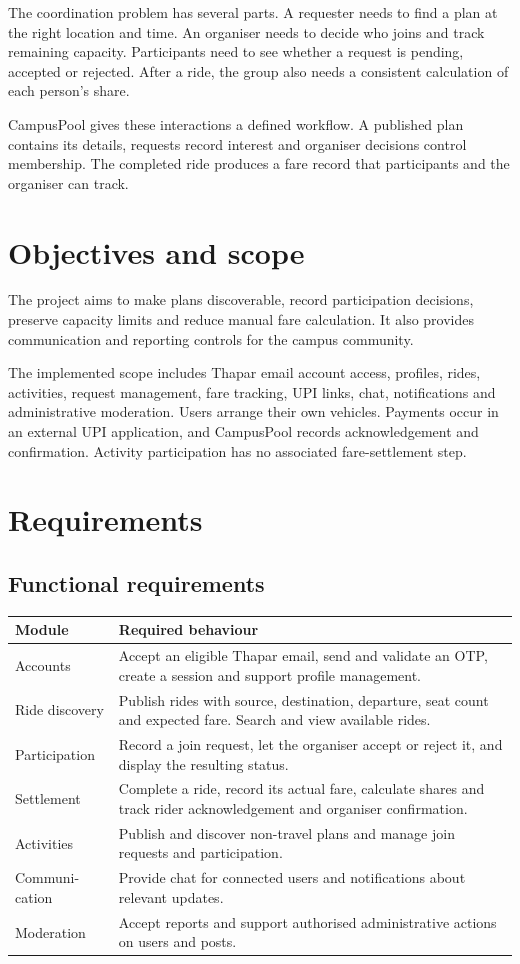 \documentclass[11pt,a4paper]{article}
\begin{document}
The coordination problem has several parts. A requester needs to find a plan at the right location and time. An organiser needs to decide who joins and track remaining capacity. Participants need to see whether a request is pending, accepted or rejected. After a ride, the group also needs a consistent calculation of each person's share.

CampusPool gives these interactions a defined workflow. A published plan contains its details, requests record interest and organiser decisions control membership. The completed ride produces a fare record that participants and the organiser can track.

\section{Objectives and scope}
The project aims to make plans discoverable, record participation decisions, preserve capacity limits and reduce manual fare calculation. It also provides communication and reporting controls for the campus community.

The implemented scope includes Thapar email account access, profiles, rides, activities, request management, fare tracking, UPI links, chat, notifications and administrative moderation. Users arrange their own vehicles. Payments occur in an external UPI application, and CampusPool records acknowledgement and confirmation. Activity participation has no associated fare-settlement step.

\clearpage
\section{Requirements}
\subsection{Functional requirements}
\begin{tabularx}{\linewidth}{@{}p{25mm}Y@{}}
\toprule
\textbf{Module} & \textbf{Required behaviour}\\
\midrule
Accounts & Accept an eligible Thapar email, send and validate an OTP, create a session and support profile management.\\[4pt]
Ride discovery & Publish rides with source, destination, departure, seat count and expected fare. Search and view available rides.\\[4pt]
Participation & Record a join request, let the organiser accept or reject it, and display the resulting status.\\[4pt]
Settlement & Complete a ride, record its actual fare, calculate shares and track rider acknowledgement and organiser confirmation.\\[4pt]
Activities & Publish and discover non-travel plans and manage join requests and participation.\\[4pt]
Communi-\newline cation & Provide chat for connected users and notifications about relevant updates.\\[4pt]
Moderation & Accept reports and support authorised administrative actions on users and posts.\\
\bottomrule
\end{tabularx}
\end{document}
